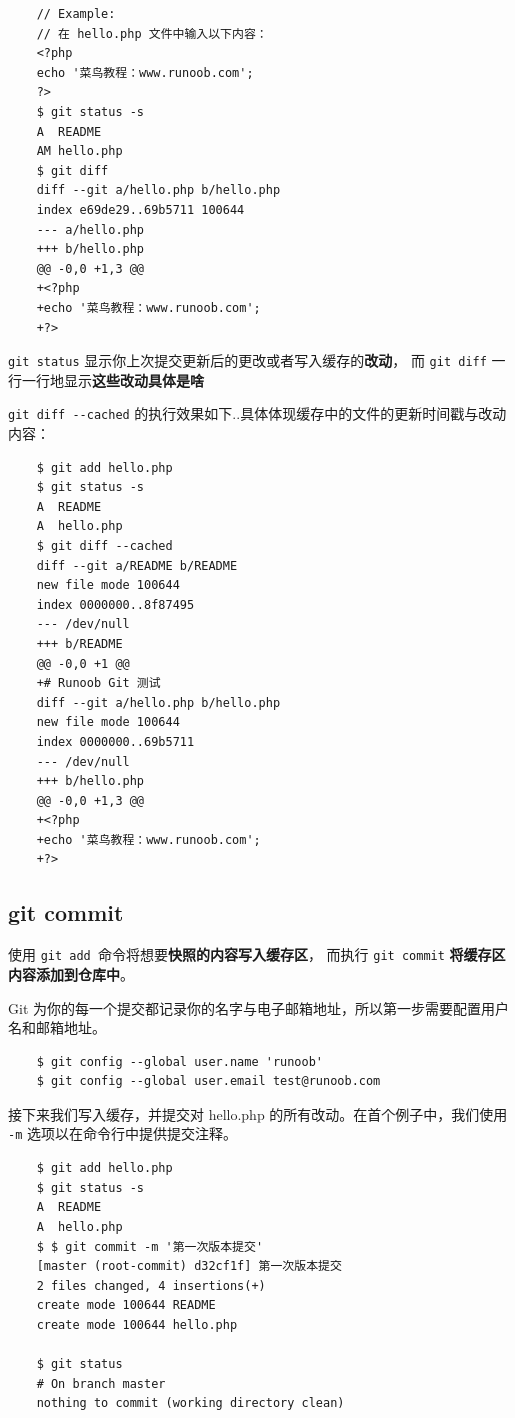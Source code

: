 \documentclass[UTF8,a4paper,12pt]{ctexbook}
\begin{document}
			\begin{lstlisting}
	// Example:
	// 在 hello.php 文件中输入以下内容：
	<?php
	echo '菜鸟教程：www.runoob.com';
	?>
	$ git status -s
	A  README
	AM hello.php
	$ git diff
	diff --git a/hello.php b/hello.php
	index e69de29..69b5711 100644
	--- a/hello.php
	+++ b/hello.php
	@@ -0,0 +1,3 @@
	+<?php
	+echo '菜鸟教程：www.runoob.com';
	+?>
			\end{lstlisting}
			
		\verb|git status| 显示你上次提交更新后的更改或者写入缓存的\textbf{改动}， 而 \verb|git diff| 一行一行地显示\textbf{这些改动具体是啥}
			
		\verb|git diff --cached| 的执行效果如下..具体体现缓存中的文件的更新时间戳与改动内容：
			\begin{lstlisting}
	$ git add hello.php 
	$ git status -s
	A  README
	A  hello.php
	$ git diff --cached
	diff --git a/README b/README
	new file mode 100644
	index 0000000..8f87495
	--- /dev/null
	+++ b/README
	@@ -0,0 +1 @@
	+# Runoob Git 测试
	diff --git a/hello.php b/hello.php
	new file mode 100644
	index 0000000..69b5711
	--- /dev/null
	+++ b/hello.php
	@@ -0,0 +1,3 @@
	+<?php
	+echo '菜鸟教程：www.runoob.com';
	+?>
			\end{lstlisting}
		\subsection{git commit}
			使用 \verb|git add |命令将想要\textbf{快照的内容写入缓存区}， 而执行 \verb|git commit| \textbf{将缓存区内容添加到仓库中}。

			Git 为你的每一个提交都记录你的名字与电子邮箱地址，所以第一步需要配置用户名和邮箱地址。
			\begin{lstlisting}
	$ git config --global user.name 'runoob'
	$ git config --global user.email test@runoob.com
			\end{lstlisting}
						
			接下来我们写入缓存，并提交对 hello.php 的所有改动。在首个例子中，我们使用 \verb|-m| 选项以在命令行中提供提交注释。
			\begin{lstlisting}
	$ git add hello.php
	$ git status -s
	A  README
	A  hello.php
	$ $ git commit -m '第一次版本提交'
	[master (root-commit) d32cf1f] 第一次版本提交
	2 files changed, 4 insertions(+)
	create mode 100644 README
	create mode 100644 hello.php
	
	$ git status
	# On branch master
	nothing to commit (working directory clean)
			\end{lstlisting}
			
\end{document}
